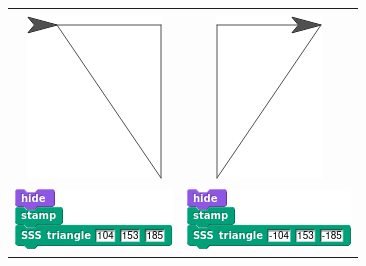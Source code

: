 \documentclass[noauthor,nooutcomes,12pt,hints,handout]{ximera}
\begin{document}
\begin{question}
\begin{freeResponse}
\begin{center}
\begin{tabular}{|c||c|}
      \hline\hline
      &  \\
      \includegraphics{stampStageIII.png} & \includegraphics{stampStageIV.png} \\
      \includegraphics{SSSstampScriptIII.png} & \includegraphics{SSSstampScriptIV.png} \\\hline
    \end{tabular}
  \end{center}
  \end{freeResponse}
\end{question}
\mynewpage
\end{document}
